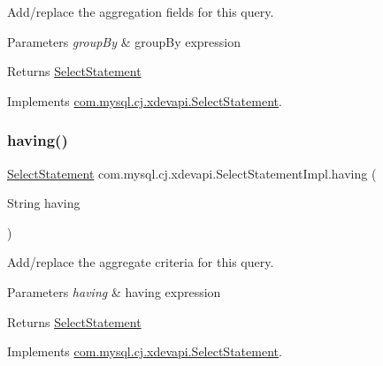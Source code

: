Add/replace the aggregation fields for this query.


\begin{DoxyParams}{Parameters}
{\em group\+By} & group\+By expression \\
\hline
\end{DoxyParams}
\begin{DoxyReturn}{Returns}
\mbox{\hyperlink{interfacecom_1_1mysql_1_1cj_1_1xdevapi_1_1_select_statement}{Select\+Statement}} 
\end{DoxyReturn}


Implements \mbox{\hyperlink{interfacecom_1_1mysql_1_1cj_1_1xdevapi_1_1_select_statement_aa711a5de1c387d46ff0a940329837ae0}{com.\+mysql.\+cj.\+xdevapi.\+Select\+Statement}}.

\mbox{\label{classcom_1_1mysql_1_1cj_1_1xdevapi_1_1_select_statement_impl_a7c95308255a21648ee6bbe698e934552}} 
\subsubsection{\texorpdfstring{having()}{having()}}
{\footnotesize\ttfamily \mbox{\hyperlink{interfacecom_1_1mysql_1_1cj_1_1xdevapi_1_1_select_statement}{Select\+Statement}} com.\+mysql.\+cj.\+xdevapi.\+Select\+Statement\+Impl.\+having (\begin{DoxyParamCaption}\item[{String}]{having }\end{DoxyParamCaption})}

Add/replace the aggregate criteria for this query.


\begin{DoxyParams}{Parameters}
{\em having} & having expression \\
\hline
\end{DoxyParams}
\begin{DoxyReturn}{Returns}
\mbox{\hyperlink{interfacecom_1_1mysql_1_1cj_1_1xdevapi_1_1_select_statement}{Select\+Statement}} 
\end{DoxyReturn}


Implements \mbox{\hyperlink{interfacecom_1_1mysql_1_1cj_1_1xdevapi_1_1_select_statement_ab1dde96bbcd60811cce5a6181008d441}{com.\+mysql.\+cj.\+xdevapi.\+Select\+Statement}}.

